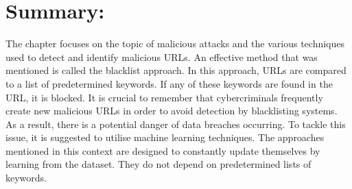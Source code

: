\section{Summary:}
The chapter focuses on the topic of malicious attacks and the various techniques used to detect and identify malicious URLs. An effective method that was mentioned is called the blacklist approach. In this approach, URLs are compared to a list of predetermined keywords. If any of these keywords are found in the URL, it is blocked. It is crucial to remember that cybercriminals frequently create new malicious URLs in order to avoid detection by blacklisting systems. As a result, there is a potential danger of data breaches occurring. To tackle this issue, it is suggested to utilise machine learning techniques. The approaches mentioned in this context are designed to constantly update themselves by learning from the dataset. They do not depend on predetermined lists of keywords.

